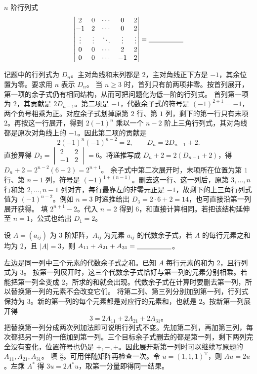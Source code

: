\documentclass[UTF8,zihao=-4,fontset=fandol]{ctexart}
\begin{document}
$n$ 阶行列式
\[
\begin{vmatrix}
 2 & 0 & \cdots & 0 & 2\\
-1 & 2 & \cdots & 0 & 2\\
\vdots & \vdots & \ddots & \vdots & \vdots\\
0 & 0 & \cdots & 2 & 2\\
0 & 0 & \cdots & -1 & 2
\end{vmatrix}
=\underline{\hspace{5em}}
\]

\Solution
\Known 记题中的行列式为 $D_n$。主对角线和末列都是 $2$，主对角线正下方是 $-1$，其余位置为零。要求用 $n$ 表示 $D_n$。
\Method 当 $n\ge3$ 时，首列只有前两项非零。按首列展开，第一项的余子式仍有相同结构，从而可把问题化为低一阶的行列式。
\Derive 首列第一项为 $2$，其贡献是 $2D_{n-1}$。第二项是 $-1$，代数余子式的符号是 $(-1)^{2+1}=-1$，两个负号相乘为正。对应余子式划掉原第 $2$ 行、第 $1$ 列，剩下的第一行只有末项 $2$。再按这一行展开，得到 $2(-1)^n$ 乘以一个 $n-2$ 阶上三角行列式，其对角线都是原次对角线上的 $-1$。因此第二项的贡献是
\[
2(-1)^n(-1)^{n-2}=2,
\qquad D_n=2D_{n-1}+2.
\]
直接算得 $D_2=\begin{vmatrix}2&2\\-1&2\end{vmatrix}=6$。将递推写成 $D_n+2=2(D_{n-1}+2)$，得 $D_n+2=2^{n-2}(6+2)=2^{n+1}$。
余子式中第二次展开时，末项所在位置为第 $1$ 行、第 $n-1$ 列，符号是 $(-1)^{1+(n-1)}$。删去这一行、这一列后，原第 $3,\ldots,n$ 行和第 $2,\ldots,n-1$ 列对齐，每行最靠左的非零元正是 $-1$，故剩下的上三角行列式值为 $(-1)^{n-2}$。例如 $n=3$ 时递推给出 $D_3=2\cdot6+2=14$，也可直接沿第一列展开获得。
\Verify 填 $\boxed{2^{n+1}-2}$。代入 $n=2$ 得到 $6$，和直接计算相同。若把该结构延伸至 $n=1$，公式也给出 $D_1=2$。

设 $A=(a_{ij})$ 为 $3$ 阶矩阵，$A_{ij}$ 为元素 $a_{ij}$ 的代数余子式，若 $A$ 的每行元素之和均为 $2$，且 $|A|=3$，则 $A_{11}+A_{21}+A_{31}=\underline{\hspace{5em}}$。

\Solution
\Known 左边是同一列中三个元素的代数余子式之和。已知 $A$ 每行元素的和为 $2$，且行列式为 $3$。
\Method 按第一列展开时，这三个代数余子式恰好与第一列的元素分别相乘。若能把第一列全变成 $2$，所求的和就会出现。代数余子式在计算时要删去第一列，所以替换第一列的元素不会改变它们。
\Derive 将第二列、第三列分别加到第一列，行列式保持为 $3$。新的第一列的每个元素都是对应行的元素和，也就是 $2$。按新第一列展开得
\[
3=2A_{11}+2A_{21}+2A_{31}\text{。}
\]
把替换第一列分成两次列加法即可说明行列式不变。先加第二列，再加第三列，每次都把另一列的一倍加到第一列。三个目标余子式删去的都是第一列，剩下两列完全没有变化，位置符号也仍是 $+,-,+$。因此展开新第一列时可以继续写原题的 $A_{11},A_{21},A_{31}$。
\Verify 填 $\boxed{\frac{3}{2}}$。可用伴随矩阵再检查一次。令 $u=(1,1,1)^{\mathrm T}$，则 $Au=2u$。左乘 $A^*$ 得 $3u=2A^*u$，取第一分量即得同一结果。
\end{document}
